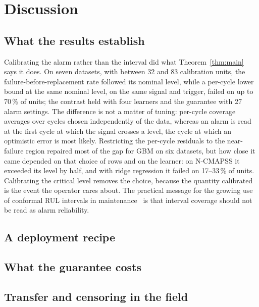 \section{Discussion}\label{sec:discussion}

\subsection{What the results establish}

Calibrating the alarm rather than the interval did what Theorem~\ref{thm:main} says it does. On seven datasets, with between 32 and 83 calibration units, the failure-before-replacement rate followed its nominal level, while a per-cycle lower bound at the same nominal level, on the same signal and trigger, failed on up to 70\,\% of units; the contrast held with four learners and the guarantee with 27 alarm settings. The difference is not a matter of tuning: per-cycle coverage averages over cycles chosen independently of the data, whereas an alarm is read at the first cycle at which the signal crosses a level, the cycle at which an optimistic error is most likely. Restricting the per-cycle residuals to the near-failure region repaired most of the gap for GBM on six datasets, but how close it came depended on that choice of rows and on the learner: on N-CMAPSS it exceeded its level by half, and with ridge regression it failed on 17--33\,\% of units. Calibrating the critical level removes the choice, because the quantity calibrated is the event the operator cares about. The practical message for the growing use of conformal RUL intervals in maintenance~\cite{javanmardi2023,robinson2026,wang2025robustuq} is that interval coverage should not be read as alarm reliability.

\subsection{A deployment recipe}



\subsection{What the guarantee costs}



\subsection{Transfer and censoring in the field}

